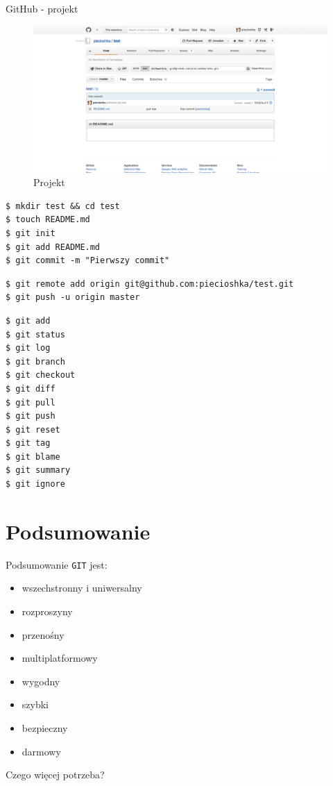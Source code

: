 \documentclass{beamer}
\begin{document}
\begin{frame}{GitHub - projekt}
  \begin{figure}
  \includegraphics[width=\textwidth]{photos/project.png}
  \caption{\label{fig:project}Projekt}
  \end{figure}
\end{frame}

\begin{framed}
\begin{lstlisting}[frame=none, caption=Praca lokalna]
$ mkdir test && cd test
$ touch README.md
$ git init
$ git add README.md
$ git commit -m "Pierwszy commit"
\end{lstlisting}
\end{framed}

\begin{framed}
\begin{lstlisting}[frame=none, caption=Praca zdalna]
$ git remote add origin git@github.com:piecioshka/test.git
$ git push -u origin master
\end{lstlisting}
\end{framed}

\begin{framed}
\begin{lstlisting}[frame=none, caption=Najpopularniejsze polecenia]
$ git add
$ git status
$ git log
$ git branch
$ git checkout
$ git diff
$ git pull
$ git push
$ git reset
$ git tag
$ git blame
$ git summary
$ git ignore
\end{lstlisting}
\end{framed}


\section{Podsumowanie}

\begin{frame}{Podsumowanie}
\texttt{GIT} jest:
\begin{itemize}
  \item wszechstronny i uniwersalny
  \item rozproszyny
  \item przenośny
  \item multiplatformowy
  \item wygodny
  \item szybki
  \item bezpieczny
  \item darmowy
\end{itemize}
\vskip 1cm
Czego więcej potrzeba?
\end{frame}
\end{document}
